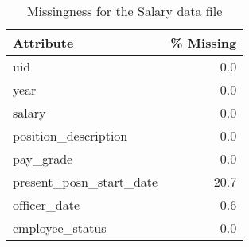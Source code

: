 \begin{table}[t!]
\caption{Missingness for the Salary data file}
\centering 
\begin{tabular}{lr}
\toprule
              Attribute &  \% Missing \\
\midrule
                    uid &        0.0 \\
                   year &        0.0 \\
                 salary &        0.0 \\
   position\_description &        0.0 \\
              pay\_grade &        0.0 \\
present\_posn\_start\_date &       20.7 \\
           officer\_date &        0.6 \\
        employee\_status &        0.0 \\
\bottomrule
\end{tabular}
\end{table}
